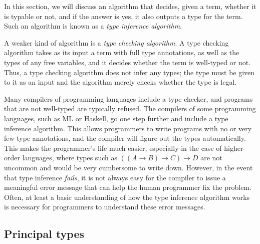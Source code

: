 \documentclass{article}
\begin{document}
In this section, we will discuss an algorithm that decides, given a
term, whether it is typable or not, and if the answer is yes, it also
outputs a type for the term. Such an algorithm is known as a {\em type
  inference algorithm}.

A weaker kind of algorithm is a {\em type checking algorithm}. A type
checking algorithm takes as its input a term with full type
annotations, as well as the types of any free variables, and it
decides whether the term is well-typed or not. Thus, a type checking
algorithm does not infer any types; the type must be given to it as an
input and the algorithm merely checks whether the type is legal. 

Many compilers of programming languages include a type checker, and
programs that are not well-typed are typically refused.  The compilers
of some programming languages, such as ML or Haskell, go one step
further and include a type inference algorithm. This allows
programmers to write programs with no or very few type annotations,
and the compiler will figure out the types automatically. This makes
the programmer's life much easier, especially in the case of
higher-order languages, where types such as $((A\to B)\to C)\to D$ are
not uncommon and would be very cumbersome to write down. However, in
the event that type inference {\em fails}, it is not always easy for
the compiler to issue a meaningful error message that can help the
human programmer fix the problem. Often, at least a basic
understanding of how the type inference algorithm works is necessary
for programmers to understand these error messages.

\subsection{Principal types}
\end{document}
